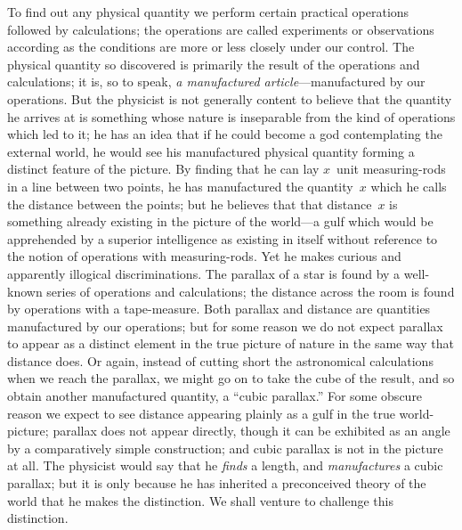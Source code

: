 \documentclass[12pt]{book}
\begin{document}
To find out any physical quantity we perform certain practical operations
followed by calculations; the operations are called experiments or observations
according as the conditions are more or less closely under our control. The
physical quantity so discovered is primarily the result of the operations and
calculations; it is, so to speak, \emph{a manufactured article}---manufactured by
%
our operations. But the physicist is not generally content to believe that the
quantity he arrives at is something whose nature is inseparable from the kind
of operations which led to it; he has an idea that if he could become a god
contemplating the external world, he would see his manufactured physical
quantity forming a distinct feature of the picture. By finding that he can
lay $x$~unit measuring-rods in a line between two points, he has manufactured
the quantity~$x$ which he calls the distance between the points; but he believes
that that distance~$x$ is something already existing in the picture of the world---a
gulf which would be apprehended by a superior intelligence as existing
in itself without reference to the notion of operations with measuring-rods.
Yet he makes curious and apparently illogical discriminations. The parallax
of a star is found by a well-known series of operations and calculations; the
distance across the room is found by operations with a tape-measure. Both
parallax and distance are quantities manufactured by our operations; but
for some reason we do not expect parallax to appear as a distinct element in
the true picture of nature in the same way that distance does. Or again,
instead of cutting short the astronomical calculations when we reach the
parallax, we might go on to take the cube of the result, and so obtain another
manufactured quantity, a ``cubic parallax.'' For some obscure reason we
expect to see distance appearing plainly as a gulf in the true world-picture;
parallax does not appear directly, though it can be exhibited as an angle by
a comparatively simple construction; and cubic parallax is not in the picture
at all. The physicist would say that he \emph{finds} a length, and \emph{manufactures} a
cubic parallax; but it is only because he has inherited a preconceived theory
of the world that he makes the distinction. We shall venture to challenge
this distinction.
\end{document}
